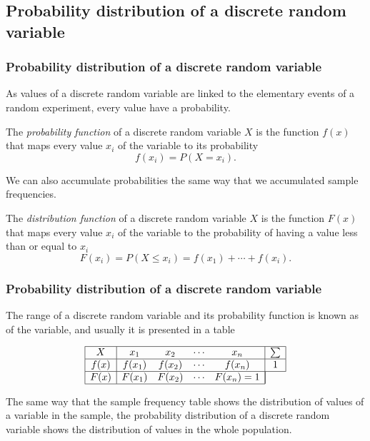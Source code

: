 \subsection{Probability distribution of a discrete random variable}

\begin{frame}
\frametitle{Probability distribution of a discrete random variable}
As values of a discrete random variable are linked to the elementary events of a random experiment, every value have a
probability. 
\begin{definition}
The \emph{probability function} of a discrete random variable $X$ is the function $f(x)$ that maps every value $x_i$ of
the variable to its probability
\[
f(x_i) = P(X=x_i).
\]
\end{definition}

We can also accumulate probabilities the same way that we accumulated sample frequencies. 

\begin{definition}
The \emph{distribution function} of a discrete random variable $X$ is the function $F(x)$ that maps every value $x_i$ of
the variable to the probability of having a value less than or equal to $x_i$ 
\[
F(x_i) = P(X\leq x_i) = f(x_1)+\cdots +f(x_i).
\]
\end{definition}
\end{frame}


\begin{frame}
\frametitle{Probability distribution of a discrete random variable}
The range of a discrete random variable and its probability function is known as  of the variable, and usually it is presented in a table 

\[
\begin{array}{|c|cccc|c|}
\hline
X & x_1 & x_2 & \cdots & x_n & \sum\\ \hline
f(x) & f(x_1) & f(x_2) & \cdots & f(x_n) & 1\\
\hline
F(x) & F(x_1) & F(x_2) & \cdots & F(x_n) =1 &\multicolumn{1}{|c}{} \\
\cline{1-5}
\end{array}
\]

The same way that the sample frequency table shows the distribution of values of a variable in the sample, the
probability distribution of a discrete random variable shows the distribution of values in the whole population. 
\end{frame}


